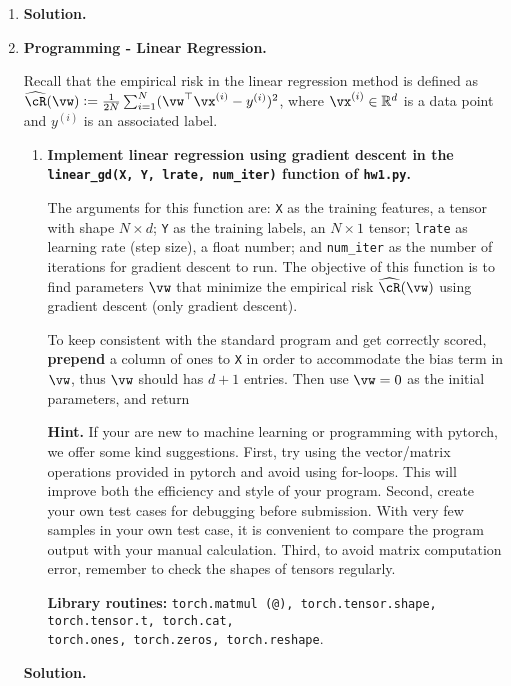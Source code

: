 \documentclass{article}
\def\R{\mathbb{R}}
\def\hcR{\widehat{\cR}}
\theoremstyle{definition}
\theoremstyle{remark}
\newenvironment{Q}
        {%
          \clearpage
          \item
        }
        {%
          \phantom{s} %
          \bigskip
          \textbf{Solution.}
        }
\begin{document}
\begin{enumerate}[font={\Large\bfseries},left=0pt]
\begin{Q}
\begin{enumerate}
\begin{enumerate}
      \end{enumerate}
\end{enumerate}
\end{Q}
\begin{tcolorbox}
\end{tcolorbox}




\begin{Q}
\textbf{\Large Programming - Linear Regression.}

Recall that the empirical risk in the linear regression method is defined as $\hcR(\vw) := \frac{1}{2N}\sum_{i=1}^N (\vw^\top \vx^{(i)} - y^{(i)})^2$, where $\vx^{(i)} \in \R^d$ is a data point and $y^{(i)}$ is an associated label.
\begin{enumerate}
\item \textbf{Implement linear regression using gradient descent in the \texttt{linear\_gd(X, Y, lrate, num\_iter)} function of \texttt{hw1.py}.} 

The arguments for this function are: \texttt{X} as the training features, a tensor with shape $N \times d$; \texttt{Y} as the training labels, an $N \times 1$ tensor; \texttt{lrate} as learning rate (step size), a float number; and \texttt{num\_iter} as the number of iterations for gradient descent to run. The objective of this function is to find parameters $\vw$ that minimize the empirical risk $\hcR(\vw)$ using gradient descent (only gradient descent). 

To keep consistent with the standard program and get correctly scored, \textbf{prepend} a column of ones to \texttt{X} in order to accommodate the bias term in $\vw$, thus $\vw$ should has $d+1$ entries. Then use $\vw = 0$ as the initial parameters, and return 

\textbf{Hint.} If your are new to machine learning or programming with pytorch, we offer some kind suggestions. First, try using the vector/matrix operations provided in pytorch and avoid using for-loops. This will improve both the efficiency and style of your program. Second, create your own test cases for debugging before submission. With very few samples in your own test case, it is convenient to compare the program output with your manual calculation. Third, to avoid matrix computation error, remember to check the shapes of tensors regularly. 
            
\textbf{Library routines:} \texttt{torch.matmul (@), torch.tensor.shape, torch.tensor.t, torch.cat,} \\ \texttt{torch.ones, torch.zeros, torch.reshape}.
            

\end{enumerate}
\end{Q}
\end{enumerate}
\end{document}
